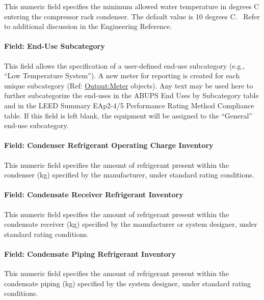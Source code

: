 This numeric field specifies the minimum allowed water temperature in degrees C entering the compressor rack condenser. The default value is 10 degrees C.~ Refer to additional discussion in the Engineering Reference.

\paragraph{Field: End-Use Subcategory}\label{field-end-use-subcategory-6}

This field allows the specification of a user-defined end-use subcategory (e.g., ``Low Temperature System''). A new meter for reporting is created for each unique subcategory (Ref: \hyperref[outputmeter-and-outputmetermeterfileonly]{Output:Meter} objects). Any text may be used here to further subcategorize the end-uses in the ABUPS End Uses by Subcategory table and in the LEED Summary EAp2-4/5 Performance Rating Method Compliance table. If this field is left blank, the equipment will be assigned to the ``General'' end-use subcategory.

\paragraph{Field: Condenser Refrigerant Operating Charge Inventory}\label{field-condenser-refrigerant-operating-charge-inventory-2}

This numeric field specifies the amount of refrigerant present within the condenser (kg) specified by the manufacturer, under standard rating conditions.

\paragraph{Field: Condensate Receiver Refrigerant Inventory}\label{field-condensate-receiver-refrigerant-inventory-2}

This numeric field specifies the amount of refrigerant present within the condensate receiver (kg) specified by the manufacturer or system designer, under standard rating conditions.

\paragraph{Field: Condensate Piping Refrigerant Inventory}\label{field-condensate-piping-refrigerant-inventory-2}

This numeric field specifies the amount of refrigerant present within the condensate piping (kg) specified by the system designer, under standard rating conditions.


